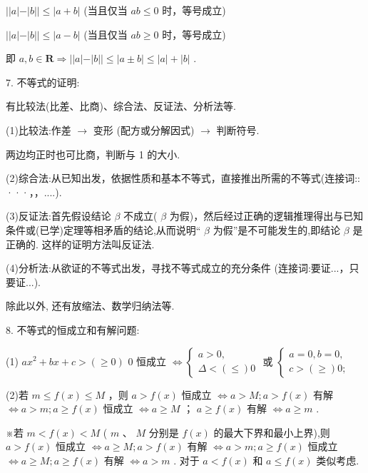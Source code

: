    $\left| \right| a\left| -\right| b\left| \right|  \leq  \left| {a + b}\right|$ (当且仅当 ${ab} \leq  0$ 时，等号成立)

   $\left| \right| a\left| -\right| b\left| \right|  \leq  \left| {a - b}\right|$ (当且仅当 ${ab} \geq  0$ 时，等号成立)

即 $a,b \in  \mathbf{R} \Rightarrow  \left| \right| a\left| -\right| b\left| \right|  \leq  \left| {a \pm  b}\right|  \leq  \left| a\right|  + \left| b\right|$ .

7. 不等式的证明:

有比较法(比差、比商)、综合法、反证法、分析法等.

(1)比较法:作差 $\rightarrow$ 变形 (配方或分解因式) $\rightarrow$ 判断符号.

两边均正时也可比商，判断与 1 的大小.

(2)综合法:从已知出发，依据性质和基本不等式，直接推出所需的不等式(连接词:: ···，，....).

(3)反证法:首先假设结论 $\beta$ 不成立( $\beta$ 为假)，然后经过正确的逻辑推理得出与已知条件或(已学)定理等相矛盾的结论,从而说明“ $\beta$ 为假”是不可能发生的,即结论 $\beta$ 是正确的. 这样的证明方法叫反证法.

(4)分析法:从欲证的不等式出发，寻找不等式成立的充分条件 (连接词:要证...，只要证...).

除此以外, 还有放缩法、数学归纳法等.

8. 不等式的恒成立和有解问题:

(1) $a{x}^{2} + {bx} + c > \left( { \geq  0}\right)$ 0 恒成立 $\Leftrightarrow  \left\{  \begin{array}{l} a > 0, \\  \Delta  < \left(  \leq  \right) 0 \end{array}\right.$ 或 $\left\{  \begin{array}{l} a = 0,b = 0, \\  c > \left(  \geq  \right) 0; \end{array}\right.$

(2)若 $m \leq  f\left( x\right)  \leq  M$ ，则 $a > f\left( x\right)$ 恒成立 $\Leftrightarrow  a > M;a > f\left( x\right)$ 有解 $\Leftrightarrow  a > m;a \geq  f\left( x\right)$ 恒成立 $\Leftrightarrow  a \geq  M$ ； $a \geq  f\left( x\right)$ 有解 $\Leftrightarrow  a \geq  m$ .

※若 $m < f\left( x\right)  < M$ ( $m$ 、 $M$ 分别是 $f\left( x\right)$ 的最大下界和最小上界),则 $a > f\left( x\right)$ 恒成立 $\Leftrightarrow  a \geq  M;a >  f\left( x\right)$ 有解 $\Leftrightarrow  a > m;a \geq  f\left( x\right)$ 恒成立 $\Leftrightarrow  a \geq  M;a \geq  f\left( x\right)$ 有解 $\Leftrightarrow  a > m$ . 对于 $a < f\left( x\right)$ 和 $a \leq  f\left( x\right)$ 类似考虑.

